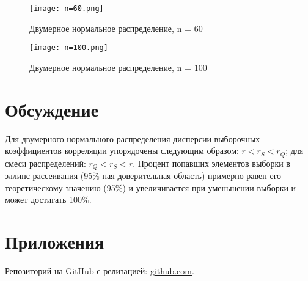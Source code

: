 \documentclass[12pt,a4paper]{scrartcl}
\begin{document}
	\begin{figure}[H]
	    \centering
	    \texttt{[image: n=60.png]}
	    \caption{Двумерное нормальное распределение, n = 60}
	    \label{fig:f60}
	\end{figure}
	
	\begin{figure}[H]
	    \centering
	    \texttt{[image: n=100.png]}
	    \caption{Двумерное нормальное распределение, n = 100}
	    \label{fig:f100}
	\end{figure}

\section{Обсуждение}
Для двумерного нормального распределения дисперсии выборочных коэффициентов корреляции упорядочены следующим образом: $r < r_{S} < r_{Q}$; для смеси распределений: $r_{Q} < r_{S} < r$.
\newline
Процент попавших элементов выборки в эллипс рассеивания (95$\%$-ная доверительная область) примерно равен его теоретическому значению (95$\%$) и увеличивается при уменьшении выборки и может достигать 100$\%$.

\section{Приложения}
Репозиторий на GitHub с релизацией: \href{https://github.com/WiillyWonka/MatStat}{github.com}.
\end{document}
